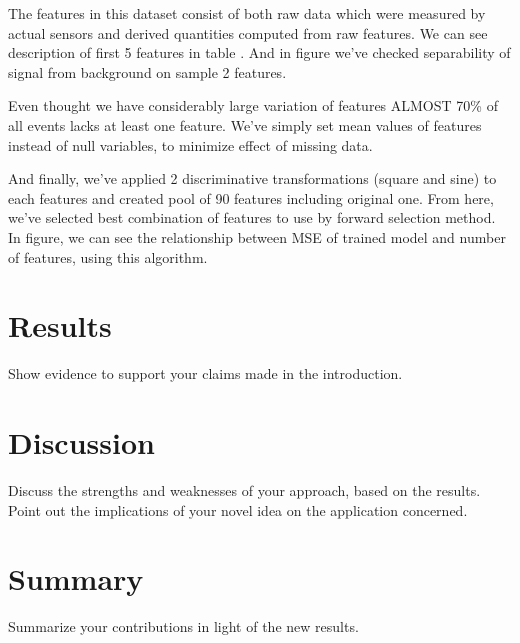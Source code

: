 \documentclass[10pt,conference,compsocconf]{IEEEtran}
\begin{document}
The features in this dataset consist of both raw data which were measured by actual sensors and derived quantities computed from raw features. We can see description of first 5 features in table {}. And in figure {} we've checked separability of signal from background on sample 2 features. 

Even thought we have considerably large variation of features ALMOST 70\% of all events lacks at least one feature. We've simply set mean values of features instead of null variables, to minimize effect of missing data. 

And finally, we've applied 2 discriminative transformations (square and sine) to each features and created pool of 90 features including original one. From here, we've selected best combination of features to use by forward selection method. In figure{}, we can see the relationship between MSE of trained model and number of features, using this algorithm.


\section{Results}
\label{S1}
  Show evidence to support your claims made in the
introduction.
\section{Discussion}
\label{S1}
  Discuss the strengths and weaknesses of your
approach, based on the results. Point out the implications of your
novel idea on the application concerned.
\section{Summary}
\label{S1}
  Summarize your contributions in light of the new
results.
\end{document}
